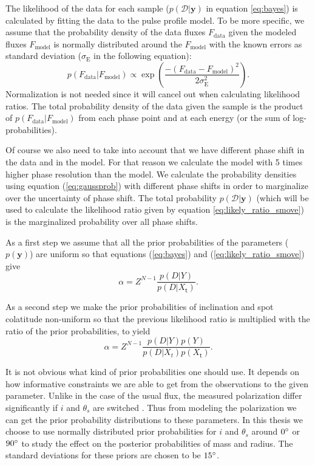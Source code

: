 \documentclass{wihuri}
\def\be{\begin{equation}}
\def\ee{\end{equation}}
\def\thetas{\theta_{s}}
\def\tstep{\mathsf{t}}
\begin{document}
The likelihood of the data for each sample ($p(\mathcal{D}|\textbf{y})$ in equation \ref{eq:bayes}) is calculated by fitting the data to the pulse profile model. To be more specific, we assume that the probability density of the data fluxes $F_{\mathrm{data}}$ given the modeled fluxes $F_{\mathrm{model}}$  is normally distributed around the $F_{\mathrm{model}}$ with the known errors as standard deviation ($\sigma_{\mathrm{E}}$ in the following equation): 
\be \label{eq:gaussprob}
p(F_{\mathrm{data}}|F_{\mathrm{model}}) \propto \exp \left (\frac{-(F_{\mathrm{data}}-F_{\mathrm{model}})^{2}}{2\sigma_{\mathrm{E}}^{2}} \right ).
\ee
Normalization is not needed since it will cancel out when calculating likelihood ratios. The total probability density of the data given the sample is the product of $p(F_{\mathrm{data}}|F_{\mathrm{model}})$ from each phase point and at each energy (or the sum of log-probabilities). 

Of course we also need to take into account that we have different phase shift in the data and in the model. For that reason we calculate the model with 5 times higher phase resolution than the model. We calculate the probability densities using equation (\ref{eq:gaussprob}) with different phase shifts in order to marginalize over the uncertainty of phase shift. %
The total probability $p(\mathcal{D}|\textbf{y})$ (which will be used to calculate the likelihood ratio given by equation \ref{eq:likely_ratio_smove}) is the marginalized probability over all phase shifts. 

As a first step we assume that all the prior probabilities of the parameters ($p(\textbf{y})$) are uniform so that equations (\ref{eq:bayes}) and (\ref{eq:likely_ratio_smove}) give 
\be \label{eq:alpha1}
\alpha = Z^{N-1}\frac{p(D|Y)}{p(D|X_{\tstep})}.
\ee

As a second step we make the prior probabilities of inclination and spot colatitude non-uniform so that the previous likelihood ratio is multiplied with the ratio of the prior probabilities, to yield
\be \label{eq:alpha2}
\alpha = Z^{N-1}\frac{p(D|Y)p(Y)}{p(D|X_{t})p(X_{\tstep})}.
\ee

It is not obvious what kind of prior probabilities one should use. It depends on how informative constraints we are able to get from the observations to the given parameter. Unlike in the case of the usual flux, the measured polarization differ significantly if $i$ and $\thetas$ are switched \cite{poutaviironen}. Thus from modeling the polarization we can get the prior probability distributions to these parameters. In this thesis we choose to use normally distributed prior probabilities for $i$ and $\thetas$ around $0 \degree$ or $90 \degree$ to study the effect on the posterior probabilities of mass and radius. The standard deviations for these priors are chosen to be $15 \degree$. 
\end{document}
